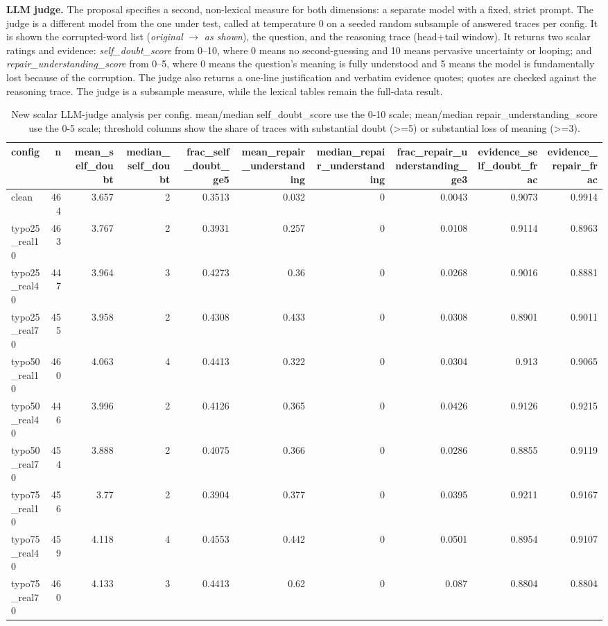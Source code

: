 \documentclass[11pt]{article}
\begin{document}
\noindent\textbf{LLM judge.} The proposal specifies a second,
non-lexical measure for both dimensions: a separate model with a fixed, strict prompt.
The judge is a different model from the one under test, called at temperature 0 on a
seeded random subsample of answered traces per config. It is shown the corrupted-word
list (\emph{original} $\to$ \emph{as shown}), the question, and the reasoning trace
(head+tail window). It returns two scalar ratings and evidence: \emph{self\_doubt\_score}
from 0--10, where 0 means no second-guessing and 10 means pervasive uncertainty or
looping; and \emph{repair\_understanding\_score} from 0--5, where 0 means the question's
meaning is fully understood and 5 means the model is fundamentally lost because of the
corruption. The judge also returns a one-line justification and verbatim evidence quotes;
quotes are checked against the reasoning trace. The judge is a subsample measure, while
the lexical tables remain the full-data result.
\medskip

\begin{table}[H]
\centering
\caption{New scalar LLM-judge analysis per config. mean/median self\_doubt\_score use the 0-10 scale; mean/median repair\_understanding\_score use the 0-5 scale; threshold columns show the share of traces with substantial doubt (>=5) or substantial loss of meaning (>=3).}
\small
\begin{adjustbox}{max width=\textwidth}
\begin{tabular}{lrrrrrrrrr}
\toprule
\textbf{config} & \textbf{n} & \textbf{mean\_self\_doubt} & \textbf{median\_self\_doubt} & \textbf{frac\_self\_doubt\_ge5} & \textbf{mean\_repair\_understanding} & \textbf{median\_repair\_understanding} & \textbf{frac\_repair\_understanding\_ge3} & \textbf{evidence\_self\_doubt\_frac} & \textbf{evidence\_repair\_frac} \\
\midrule
clean & 464 & 3.657 & 2 & 0.3513 & 0.032 & 0 & 0.0043 & 0.9073 & 0.9914 \\
typo25\_real10 & 463 & 3.767 & 2 & 0.3931 & 0.257 & 0 & 0.0108 & 0.9114 & 0.8963 \\
typo25\_real40 & 447 & 3.964 & 3 & 0.4273 & 0.36 & 0 & 0.0268 & 0.9016 & 0.8881 \\
typo25\_real70 & 455 & 3.958 & 2 & 0.4308 & 0.433 & 0 & 0.0308 & 0.8901 & 0.9011 \\
typo50\_real10 & 460 & 4.063 & 4 & 0.4413 & 0.322 & 0 & 0.0304 & 0.913 & 0.9065 \\
typo50\_real40 & 446 & 3.996 & 2 & 0.4126 & 0.365 & 0 & 0.0426 & 0.9126 & 0.9215 \\
typo50\_real70 & 454 & 3.888 & 2 & 0.4075 & 0.366 & 0 & 0.0286 & 0.8855 & 0.9119 \\
typo75\_real10 & 456 & 3.77 & 2 & 0.3904 & 0.377 & 0 & 0.0395 & 0.9211 & 0.9167 \\
typo75\_real40 & 459 & 4.118 & 4 & 0.4553 & 0.442 & 0 & 0.0501 & 0.8954 & 0.9107 \\
typo75\_real70 & 460 & 4.133 & 3 & 0.4413 & 0.62 & 0 & 0.087 & 0.8804 & 0.8804 \\
\bottomrule
\end{tabular}
\end{adjustbox}
\end{table}
\end{document}
